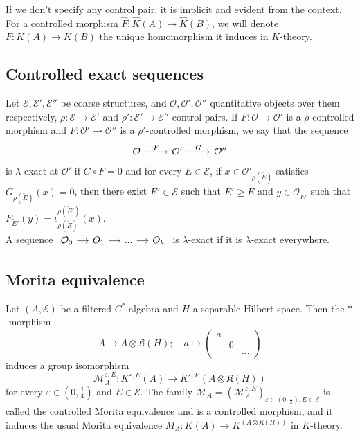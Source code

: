 If we don't specify any control pair, it is implicit and evident from the context. For a controlled morphism $\hat F : \hat K(A)\rightarrow \hat K(B)$, we will denote $F:K(A)\rightarrow K(B)$ the unique homomorphism it induces in $K$-theory.\\
\subsection{Controlled exact sequences}

\begin{definition}
Let $\mathcal E,\mathcal E',\mathcal E''$ be coarse structures, and $ \mathcal O,\mathcal O',\mathcal O''$ quantitative objects over them respectively, $\rho : \mathcal E\rightarrow \mathcal E'$ and $\rho' : \mathcal E'\rightarrow \mathcal E''$ control pairs. If $F : \mathcal O\rightarrow \mathcal O'$ is a $\rho$-controlled morphism and $F : \mathcal O'\rightarrow \mathcal O''$ is a $\rho'$-controlled morphism, we say that the sequence 
\[\begin{tikzcd}\mathcal O\arrow{r}{F} & \mathcal O'\arrow{r}{G} & \mathcal O''\end{tikzcd}\] 
is $\lambda$-exact at $\mathcal O'$ if $G\circ F = 0$ and for every $\tilde{ E}\in \tilde{\mathcal E}$, if $x \in \mathcal O'_{\rho (\tilde{E})}$ satisfies $G_{\rho (\tilde E)}(x)=0$, then there exist $\tilde E'\in \mathcal E$ such that $\tilde E'\geq \tilde E$ and $y\in \mathcal O_{\tilde E'}$ such that $F_{\tilde E'}(y)=\iota_{\rho(\tilde E)}^{\rho(\tilde E')}(x) $.\\

A sequence $\begin{tikzcd}[column sep = small]\mathcal O_0 \arrow{r} & O_1 \arrow{r}&... \arrow{r}& O_k\end{tikzcd}$ is $\lambda$-exact if it is $\lambda$-exact everywhere.
\end{definition}

\subsection{Morita equivalence}

\begin{prop}
Let $(A,\mathcal E)$ be a filtered $C^*$-algebra and $H$ a separable Hilbert space. Then the $*$-morphism
\[A\rightarrow A\otimes \mathfrak K(H) ; \quad a\mapsto 
\begin{pmatrix}a & & \\  & 0 & \\ & & ... \end{pmatrix}\]
induces a group isomorphism 
\[\mathcal M_A^{\varepsilon,E} : K^{\varepsilon,E}(A)\rightarrow K^{\varepsilon,E}(A\otimes \mathfrak K(H)) \]
for every $\varepsilon\in(0,\frac{1}{4})$ and $E\in\mathcal E$. The family $\mathcal M_A = (\mathcal M_A^{\varepsilon,E} )_{\varepsilon\in(0,\frac{1}{4}),E\in\mathcal E}$ is called the controlled Morita equivalence and is a controlled morphism, and it induces the usual Morita equivalence $M_A: K(A)\rightarrow K^(A\otimes \mathfrak K(H))$ in $K$-theory. 
\end{prop}

